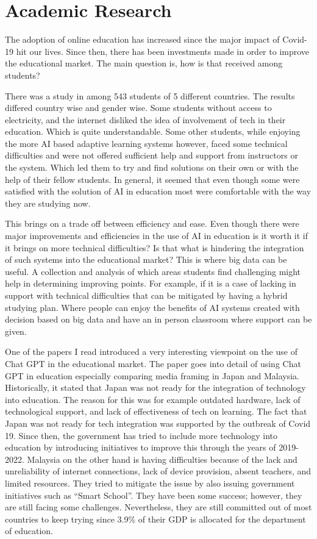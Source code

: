 \documentclass{imc-inf}
\begin{document}
\section{Academic Research }
The adoption of online education has increased since the major impact of Covid-19 hit our lives. Since then, there has been investments made in order to improve the educational market. The main question is, how is that received among students?

There was a study in \cite{2} among 543 students of 5 different countries. The results differed country wise and gender wise. Some students without access to electricity, and the internet disliked the idea of involvement of tech in their education. Which is quite understandable. Some other students, while enjoying the more AI based adaptive learning systems however, faced some technical difficulties and were not offered sufficient help and support from instructors or the system. Which led them to try and find solutions on their own or with the help of their fellow students. In general, it seemed that even though some were satisfied with the solution of AI in education most were comfortable with the way they are studying now. 

This brings on a trade off between efficiency and ease. Even though there were major improvements and efficiencies in the use of AI in education is it worth it if it brings on more technical difficulties? Is that what is hindering the integration of such systems into the educational market? 
This is where big data can be useful. A collection and analysis of which areas students find challenging might help in determining improving points. For example, if it is a case of lacking in support with technical difficulties that can be mitigated by having a hybrid studying plan. Where people can enjoy the benefits of AI systems created with decision based on big data and have an in person classroom where support can be given. 

One of the papers I read introduced a very interesting viewpoint on the use of Chat GPT in the educational market. The paper \cite{3} goes into detail of using Chat GPT in education especially comparing media framing in Japan and Malaysia. Historically, it stated that Japan was not ready for the integration of technology  into education. The reason for this was for example outdated hardware, lack of technological support, and lack of effectiveness of tech on learning. The fact that Japan was not ready for tech integration was supported by the outbreak of Covid 19. Since then, the government has tried to include more technology into education by introducing initiatives to improve this through the years of 2019-2022. Malaysia on the other hand is having difficulties because of the lack and unreliability of internet connections, lack of device provision, absent teachers, and limited resources. They tried to mitigate the issue by also issuing government initiatives such as “Smart School”. They have been some success; however, they are still facing some challenges. Nevertheless, they are still committed out of most countries to keep trying since 3.9\% of their GDP is allocated for the department of education. 
\end{document}
